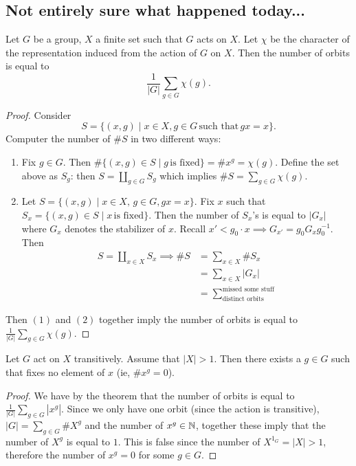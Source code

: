     \subsection{Not entirely sure what happened today...}
    \begin{theorem}
        Let $G$ be a group, $X$ a finite set such that $G$ acts on $X$. Let $\chi$ be the character of the representation induced from the action of $G$ on $X$. Then the number of orbits is equal to  \[
            \frac{1}{|G|}\sum_{g\in G}^{} \chi(g).
        \] 
    \end{theorem}
\begin{proof}
    Consider \[
        S=\{(x,g) \mid x\in X, g\in G\,\text{such that}\, gx=x \} .
    \] Computer the number of $\#S$ in two different ways:
    \begin{enumerate}
        \item Fix $g\in G$. Then $\# \{(x,g)\in S \mid g\, \text{is fixed}\} =\#x^g=\chi(g)$. Define the set above as $S_g$: then $S=\amalg_{g\in G} S_g$ which implies $\#S=\sum_{g\in G}^{} \chi(g)$.
        \item Let $S=\{(x,g) \mid x\in X,\,g\in G,gx=x\} $. Fix $x$ such that $S_x=\{(x,g)\in S \mid x \,\text{is fixed}\} $. Then the number of $S_x $'s is equal to $|G_x|$ where $G_x$ denotes the stabilizer of $x$. Recall $x'<g_0\cdot x \implies G_{x'}=g_0G_xg_0^{-1}$. Then 
            \begin{align*}
                S=\amalg_{x\in X}S_x\implies \#S&=\sum_{x\in X}^{} \# S_x\\
                 &=\sum_{x\in X}^{} |G_x|\\
                 &=\sum_{\text{distinct orbits}}^{\text{missed some stuff}} 
            \end{align*}
    \end{enumerate}
    Then $(1)$ and $(2)$ together imply the number of orbits is equal to $\frac{1}{|G|}\sum_{g\in G}^{} \chi(g).$
\end{proof}
\begin{cor}
    Let $G$ act on $X$ transitively. Assume that $|X|>1$. Then there exists a $g\in G$ such that fixes no element of $x$ (ie, $\#x^g=0$).
\end{cor}
\begin{proof}
    We have by the theorem that the number of orbits is equal to $\frac{1}{|G|}\sum_{g\in G}^{} |x^g|.$ Since we only have one orbit (since the action is transitive),  $|G|=\sum_{g\in G}^{} \#X^g$ and the number of $x^g \in \mathbb{N}$, together these imply that the number of $X^g$ is equal to $1$. This is false since the number of $X^{1_G}=|X|>1$, therefore the number of $x^g=0$ for some $g\in G$.
\end{proof}
